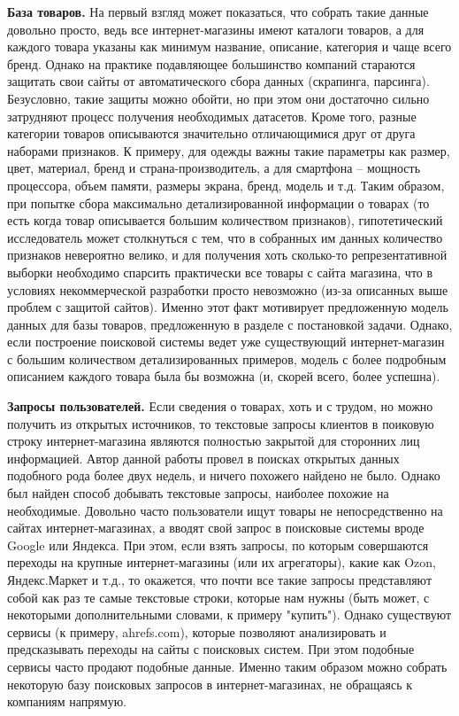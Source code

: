 \documentclass[12pt,a4paper]{article}
\begin{document}
\textbf{База товаров.} На первый взгляд может показаться, что собрать такие данные довольно просто, ведь все интернет-магазины имеют каталоги товаров, а для каждого товара указаны как минимум название, описание, категория и чаще всего бренд. Однако на практике подавляющее большинство компаний стараются защитать свои сайты от автоматического сбора данных (скрапинга, парсинга). Безусловно, такие защиты можно обойти, но при этом они достаточно сильно затрудняют процесс получения необходимых датасетов. Кроме того, разные категории товаров описываются значительно отличающимися друг от друга наборами признаков. К примеру, для одежды важны такие параметры как размер, цвет, материал, бренд и страна-производитель, а для смартфона -- мощность процессора, объем памяти, размеры экрана, бренд, модель и т.д. Таким образом, при попытке сбора максимально детализированной информации о товарах (то есть когда товар описывается большим количеством признаков), гипотетический исследователь может столкнуться с тем, что в собранных им данных количество признаков невероятно велико, и для получения хоть сколько-то репрезентативной выборки необходимо спарсить практически все товары с сайта магазина, что в условиях некоммерческой разработки просто невозможно (из-за описанных выше проблем с защитой сайтов). Именно этот факт мотивирует предложенную модель данных для базы товаров, предложенную в разделе с постановкой задачи. Однако, если построение поисковой системы ведет уже существующий интернет-магазин с большим количеством детализированных примеров, модель с более подробным описанием каждого товара была бы возможна (и, скорей всего, более успешна).

\textbf{Запросы пользователей.} Если сведения о товарах, хоть и с трудом, но можно получить из открытых источников, то текстовые запросы клиентов в поиковую строку интернет-магазина являются полностью закрытой для сторонних лиц информацией. Автор данной работы провел в поисках открытых данных подобного рода более двух недель, и ничего похожего найдено не было. Однако был найден способ добывать текстовые запросы, наиболее похожие на необходимые. Довольно часто пользователи ищут товары не непосредственно на сайтах интернет-магазинах, а вводят свой запрос в поисковые системы вроде Google или Яндекса. При этом, если взять запросы, по которым совершаются переходы на крупные интернет-магазины (или их агрегаторы), какие как Ozon, Яндекс.Маркет и т.д., то окажется, что почти все такие запросы представляют собой как раз те самые текстовые строки, которые нам нужны (быть может, с некоторыми дополнительными словами, к примеру "купить"). Однако существуют сервисы (к примеру, ahrefs.com), которые позволяют анализировать и предсказывать переходы на сайты с поисковых систем. При этом подобные сервисы часто продают подобные данные. Именно таким образом можно собрать некоторую базу поисковых запросов в интернет-магазинах, не обращаясь к компаниям напрямую.
\end{document}
